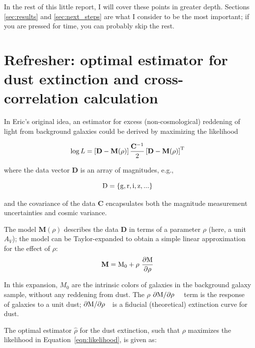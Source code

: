 \documentclass[11pt, oneside]{article}   	%
\newcommand{\dMdp}{\rm \frac{\partial M}{\partial \rho}}
\newcommand{\dMinline}{$\rm \partial M / \partial \rho$~}
\begin{document}
In the rest of this little report, I will cover these points in greater depth. Sections \ref{sec:results} and \ref{sec:next_steps} are what I consider to be the most important; if you are pressed for time, you can probably skip the rest. 
 

\section{Refresher: optimal estimator for dust extinction and cross-correlation calculation}\label{sec:theory}

In Eric's original idea, an estimator for excess (non-cosmological) reddening of light from background galaxies could be derived by maximizing the likelihood 

\begin{equation}\label{eqn:likelihood}
\log L = \rm \left [\mathbf{D} - \mathbf{M}(\rho)\right ] \frac{\mathbf{C}^{-1}}{2} \left[\mathbf{D} - \mathbf{M}(\rho)\right ]^{\rm T}
\end{equation}

where the data vector $\mathbf{D}$ is an array of magnitudes, e.g.,

\begin{equation}\label{eqn:data_vector}
\mathbf{\rm D} = \{\rm g,r,i,z,...\}
\end{equation}

and the covariance of the data $\mathbf{C}$ encapsulates both the magnitude measurement uncertainties and cosmic variance.

The model $\mathbf{M}(\rho)$ describes the data $\mathbf{D}$ in terms of a parameter $\rho$ (here, a unit $A_V$); the model can be Taylor-expanded to obtain a simple linear approximation for the effect of $\rho$:
\begin{equation}\label{model}
\rm \mathbf{M} = M_0 + \rho\ \dMdp
\end{equation}
 
In this expansion, $M_0$ are the intrinsic colors of galaxies in the background galaxy sample, without any reddening from dust. The $\rho$ \dMinline~ term is the response of galaxies to a unit dust; \dMinline~is a fiducial (theoretical) extinction curve for dust.

The optimal estimator $\hat{\rho}$ for the dust extinction, such that $\rho$ maximizes the likelihood in Equation~\ref{eqn:likelihood}, is given as: 
\end{document}
